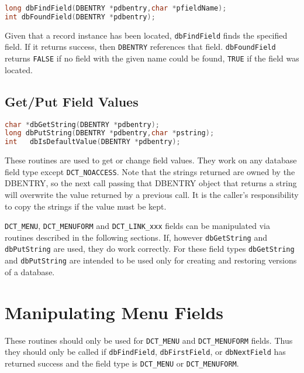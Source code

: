 \begin{lstlisting}[language=C]
long dbFindField(DBENTRY *pdbentry,char *pfieldName);
int dbFoundField(DBENTRY *pdbentry);

\end{lstlisting}

Given that a record instance has been located, \verb|dbFindField| finds the specified field.
If it returns success, then \verb|DBENTRY| references that field.
\verb|dbFoundField| returns \verb|FALSE| if no field with the given name could be found, \verb|TRUE| if the field was located.

\subsection{Get/Put Field Values}

\begin{lstlisting}[language=C]
char *dbGetString(DBENTRY *pdbentry);
long dbPutString(DBENTRY *pdbentry,char *pstring);
int   dbIsDefaultValue(DBENTRY *pdbentry);
\end{lstlisting}

These routines are used to get or change field values.
They work on any database field type except \verb|DCT_NOACCESS|.
Note that the strings returned are owned by the DBENTRY, so the next call passing that DBENTRY object that returns a string will overwrite the value returned by a previous call.
It is the caller's responsibility to copy the strings if the value must be kept.

\verb|DCT_MENU|, \verb|DCT_MENUFORM| and \verb|DCT_LINK_xxx| fields can be manipulated via routines described in the following sections.
If, however \verb|dbGetString| and \verb|dbPutString| are used, they do work correctly.
For these field types \verb|dbGetString| and \verb|dbPutString| are intended to be used only for creating and restoring versions of a database.

\section{Manipulating Menu Fields}

These routines should only be used for \verb|DCT_MENU| and \verb|DCT_MENUFORM| fields.
Thus they should only be called if \verb|dbFindField|, \verb|dbFirstField|, or \verb|dbNextField| has returned success and the field type is \verb|DCT_MENU| or \verb|DCT_MENUFORM|.

